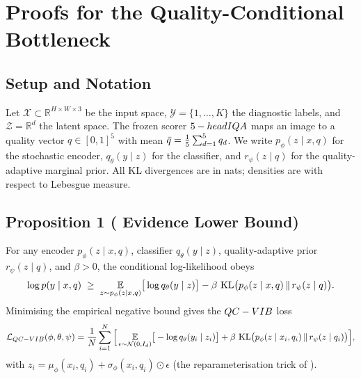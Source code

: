 
\section{Proofs for the Quality-Conditional Bottleneck}\label{app:a1}

\subsection{Setup and Notation}\label{app:a1-setup}
Let $\mathcal{X}\subset\mathbb{R}^{H\times W\times 3}$ be the input space, $\mathcal{Y}=\{1,\dots,K\}$ the
diagnostic labels, and $\mathcal{Z}=\mathbb{R}^d$ the latent space. The frozen scorer
$5-head IQA$ maps an image to a quality vector $q\in[0,1]^5$ with mean
$\bar{q}=\tfrac{1}{5}\sum_{d=1}^5 q_d$. We write $p_\phi(z\mid x,q)$ for the stochastic encoder,
$q_\theta(y\mid z)$ for the classifier, and $r_\psi(z\mid q)$ for the quality-adaptive marginal
prior. All KL divergences are in nats; densities are with respect to Lebesgue measure.

\subsection{Proposition 1 (\qvib{} Evidence Lower Bound)}\label{app:a1-prop1}

\begin{proposition}[restated]\label{prop:elbo-full}
For any encoder $p_\phi(z\mid x,q)$, classifier $q_\theta(y\mid z)$, quality-adaptive prior
$r_\psi(z\mid q)$, and $\beta>0$, the conditional log-likelihood obeys
\begin{equation}
\log p(y\mid x,q) \;\geq\;
\operatorname*{\mathbb{E}}_{z\sim p_\phi(z\mid x,q)}\!\big[\log q_\theta(y\mid z)\big]
- \beta\,\operatorname{KL}\!\big(p_\phi(z\mid x,q)\,\|\,r_\psi(z\mid q)\big).
\label{eq:a1-elbo}
\end{equation}
Minimising the empirical negative bound gives the $QC-VIB$ loss
\begin{equation}
\mathcal{L}_{QC-VIB}(\phi,\theta,\psi)
= \frac{1}{N}\sum_{i=1}^{N}\Big[
\operatorname*{\mathbb{E}}_{\epsilon\sim\mathcal{N}(0,I_d)}\!\big[-\log q_\theta(y_i\mid z_i)\big]
+ \beta\,\operatorname{KL}\!\big(p_\phi(z\mid x_i,q_i)\,\|\,r_\psi(z\mid q_i)\big)\Big],
\label{eq:a1-loss}
\end{equation}
with $z_i = \mu_\phi(x_i,q_i) + \sigma_\phi(x_i,q_i)\odot\epsilon$ (the reparameterisation trick of \citealp{kingma2014auto}).
\end{proposition}

